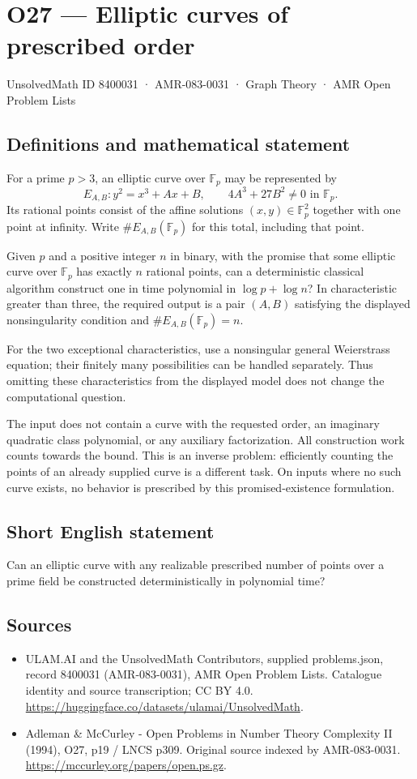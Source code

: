 \documentclass[11pt,a4paper]{article}
\begin{document}
\section*{O27 — Elliptic curves of prescribed order}\label{8400031}
{\small UnsolvedMath ID 8400031 · AMR-083-0031 · Graph Theory · AMR Open Problem Lists}
\subsection{Definitions and mathematical statement}
For a prime $p>3$, an elliptic curve over $\mathbb F_p$ may be represented by
\[
E_{A,B}:y^2=x^3+Ax+B,\qquad 4A^3+27B^2\ne0\text{ in }\mathbb F_p.
\]
Its rational points consist of the affine solutions $(x,y)\in\mathbb F_p^2$ together with one point at infinity. Write $\#E_{A,B}(\mathbb F_p)$ for this total, including that point.

Given $p$ and a positive integer $n$ in binary, with the promise that some elliptic curve over $\mathbb F_p$ has exactly $n$ rational points, can a deterministic classical algorithm construct one in time polynomial in $\log p+\log n$? In characteristic greater than three, the required output is a pair $(A,B)$ satisfying the displayed nonsingularity condition and $\#E_{A,B}(\mathbb F_p)=n$.

For the two exceptional characteristics, use a nonsingular general Weierstrass equation; their finitely many possibilities can be handled separately. Thus omitting these characteristics from the displayed model does not change the computational question.

The input does not contain a curve with the requested order, an imaginary quadratic class polynomial, or any auxiliary factorization. All construction work counts towards the bound. This is an inverse problem: efficiently counting the points of an already supplied curve is a different task. On inputs where no such curve exists, no behavior is prescribed by this promised-existence formulation.
\subsection{Short English statement}
Can an elliptic curve with any realizable prescribed number of points over a prime field be constructed deterministically in polynomial time?
\subsection{Sources}
\begin{itemize}
\item[S1] ULAM.AI and the UnsolvedMath Contributors, supplied problems.json, record 8400031 (AMR-083-0031), AMR Open Problem Lists. Catalogue identity and source transcription; CC BY 4.0.
\url{https://huggingface.co/datasets/ulamai/UnsolvedMath}.
\item[S2] Adleman \& McCurley - Open Problems in Number Theory Complexity II (1994), O27, p19 / LNCS p309. Original source indexed by AMR-083-0031.
\url{https://mccurley.org/papers/open.ps.gz}.
\end{itemize}
\end{document}
